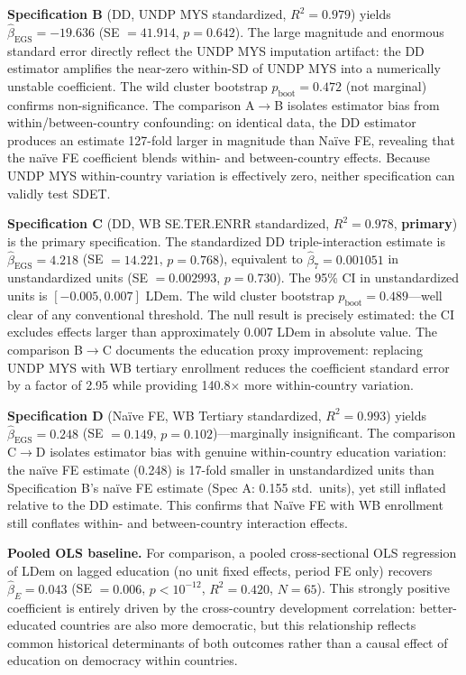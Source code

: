 \documentclass[11pt,letterpaper]{article}
\begin{document}
\textbf{Specification B} (DD, UNDP MYS standardized, $R^2 = 0.979$) yields $\hat{\beta}_\text{EGS}
= -19.636$ (SE $= 41.914$, $p = 0.642$). The large magnitude and enormous standard error directly
reflect the UNDP MYS imputation artifact: the DD estimator amplifies the near-zero within-SD of
UNDP MYS into a numerically unstable coefficient. The wild cluster bootstrap $p_\text{boot} =
0.472$ (not marginal) confirms non-significance. The comparison A$\to$B isolates estimator bias
from within/between-country confounding: on identical data, the DD estimator produces an estimate
127-fold larger in magnitude than Na\"{i}ve FE, revealing that the na\"{i}ve FE coefficient blends
within- and between-country effects. Because UNDP MYS within-country variation is effectively
zero, neither specification can validly test SDET.

\textbf{Specification C} (DD, WB SE.TER.ENRR standardized, $R^2 = 0.978$, \textbf{primary}) is
the primary specification. The standardized DD triple-interaction estimate is $\hat{\beta}_\text{EGS}
= 4.218$ (SE $= 14.221$, $p = 0.768$), equivalent to $\hat{\beta}_7 = 0.001051$ in unstandardized
units (SE $= 0.002993$, $p = 0.730$). The 95\% CI in unstandardized units is $[-0.005, 0.007]$
LDem. The wild cluster bootstrap $p_\text{boot} = 0.489$---well clear of any conventional threshold.
The null result is precisely estimated: the CI excludes effects larger than approximately 0.007
LDem in absolute value. The comparison B$\to$C documents the education proxy improvement:
replacing UNDP MYS with WB tertiary enrollment reduces the coefficient standard error by a factor
of 2.95 while providing 140.8$\times$ more within-country variation.

\textbf{Specification D} (Na\"{i}ve FE, WB Tertiary standardized, $R^2 = 0.993$) yields
$\hat{\beta}_\text{EGS} = 0.248$ (SE $= 0.149$, $p = 0.102$)---marginally insignificant. The
comparison C$\to$D isolates estimator bias with genuine within-country education variation: the
na\"{i}ve FE estimate (0.248) is 17-fold smaller in unstandardized units than Specification B's
na\"{i}ve FE estimate (Spec A: 0.155 std.\ units), yet still inflated relative to the DD estimate.
This confirms that Na\"{i}ve FE with WB enrollment still conflates within- and between-country
interaction effects.

\textbf{Pooled OLS baseline.} For comparison, a pooled cross-sectional OLS regression of LDem on
lagged education (no unit fixed effects, period FE only) recovers $\hat{\beta}_E = 0.043$
(SE $= 0.006$, $p < 10^{-12}$, $R^2 = 0.420$, $N = 65$). This strongly positive coefficient is
entirely driven by the cross-country development correlation: better-educated countries are also
more democratic, but this relationship reflects common historical determinants of both outcomes
rather than a causal effect of education on democracy within countries.
\end{document}
